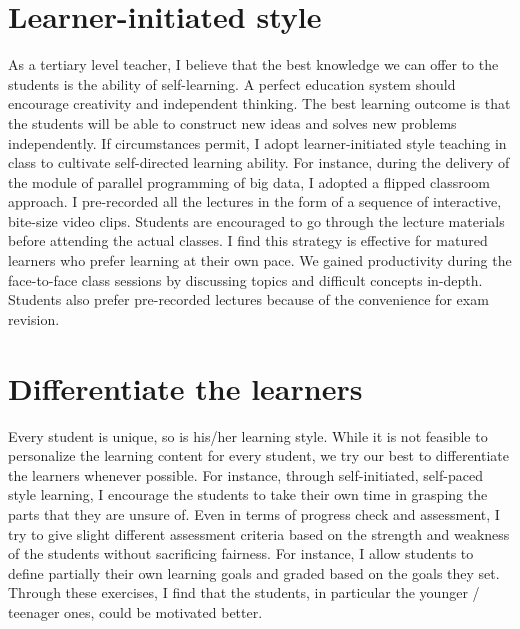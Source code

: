 \documentclass[12pt]{article}
\theoremstyle{plain} \numberwithin{equation}{section}
\theoremstyle{definition}
\begin{document}
\section{Learner-initiated style}
As a tertiary level teacher, I believe that the best knowledge we can offer
to the students is the ability of self-learning. 
A perfect education system should encourage creativity and independent 
thinking. The best learning outcome is that the students will be able to construct 
new ideas and solves new problems independently. If circumstances
permit, I adopt learner-initiated style teaching in class to cultivate
self-directed learning ability. For instance, during the delivery of
the module of parallel programming of big data, I adopted a flipped
classroom approach. I pre-recorded all the lectures in the form of
a sequence of interactive, bite-size video clips. Students are encouraged to go through the
lecture materials before attending the actual classes.
I find this strategy is effective for matured learners who prefer
learning at their own pace.
We gained productivity during the face-to-face class sessions by discussing
topics and difficult concepts in-depth. Students also prefer pre-recorded lectures because of
the convenience for exam revision.


\section{Differentiate the learners}
Every student is unique, so is his/her learning style. While
it is not feasible to personalize
the learning content for every student, we try our best to differentiate
the learners whenever possible. For instance, through self-initiated,
self-paced style learning, I encourage the students to take their own
time in grasping the parts that they are unsure of. Even in terms of
progress check and assessment, I try to give slight different
assessment criteria based on the strength and weakness of the students
without sacrificing fairness. For instance, I allow students to define
partially their own learning goals and graded based on the goals they
set. Through these exercises, I find that the students, in particular
the younger / teenager ones, could be motivated better.
\end{document}
